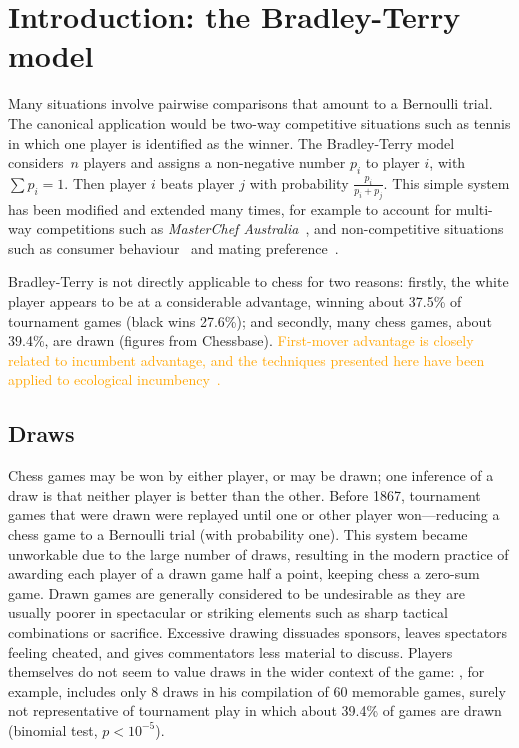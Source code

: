 \documentclass[review]{elsarticle}
\begin{document}
\section{Introduction: the Bradley-Terry model}

Many situations involve pairwise comparisons that amount to a
Bernoulli trial.  The canonical application would be two-way
competitive situations such as tennis in which one player is
identified as the winner.  The Bradley-Terry
model~\citep{bradley1952,turner2012} considers~$n$ players and assigns
a non-negative number $p_i$ to player $i$, with $\sum p_i=1$.  Then
player $i$ beats player $j$ with probability $\frac{p_i}{p_i+p_j}$.
This simple system has been modified and extended many times, for
example to account for multi-way competitions such as {\em MasterChef
  Australia}~\citep{hankin2017}, and non-competitive situations such
as consumer behaviour~\citep{hankin2010} and mating
preference~\citep{west2008}.

Bradley-Terry is not directly applicable to chess for two reasons:
firstly, the white player appears to be at a considerable advantage,
winning about 37.5\% of tournament games (black wins 27.6\%); and
secondly, many chess games, about 39.4\%, are drawn (figures from
Chessbase).  \textcolor{orange}{First-mover advantage is closely
  related to incumbent advantage, and the techniques presented here
  have been applied to ecological incumbency~\cite{hankin2010}.}

\subsection{Draws} Chess games may be won by either player, or may be
drawn; one inference of a draw is that neither player is better than
the other.  Before 1867, tournament games that were drawn were
replayed until one or other player won---reducing a chess game to a
Bernoulli trial (with probability one).  This system became unworkable
due to the large number of draws, resulting in the modern practice of
awarding each player of a drawn game half a point, keeping chess a
zero-sum game.  Drawn games are generally considered to be undesirable
as they are usually poorer in spectacular or striking elements such as
sharp tactical combinations or sacrifice.  Excessive drawing dissuades
sponsors, leaves spectators feeling cheated, and gives commentators
less material to discuss.  Players themselves do not seem to value
draws in the wider context of the game: \citet{fischer1969},
for example, includes only 8 draws in his compilation of 60 memorable
games, surely not representative of tournament play in which about
39.4\% of games are drawn (binomial test, $p<10^{-5}$).
\end{document}
